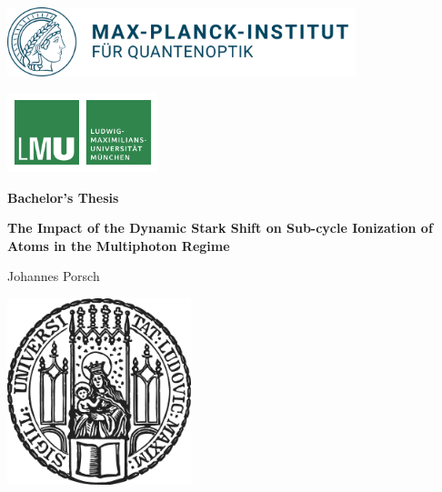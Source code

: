 \begin{titlepage}


    \centering
    
    \begin{minipage}{0.5\textwidth}
        \includegraphics[height=2cm]{figures/mpq.png}
    \end{minipage}
    \hfill
    \begin{minipage}{0.3\textwidth}
        \includegraphics[height=2.3cm]{figures/lmu-logo.pdf}
    \end{minipage}

    
    \vspace{1.5cm}

    {\Large \bfseries Bachelor's Thesis}

    \vspace{0.5cm}
    
    {\huge\bfseries The Impact of the Dynamic Stark Shift on Sub-cycle Ionization of Atoms in the Multiphoton Regime\\[0.1cm]}
    
    \vspace{0.7cm}
    
    {\Large Johannes Porsch}
    
    \vspace{0.6cm}
    
    \vfill
    
    \includegraphics[width = 0.4\textwidth]{figures/sigillum.png}


\end{titlepage}
